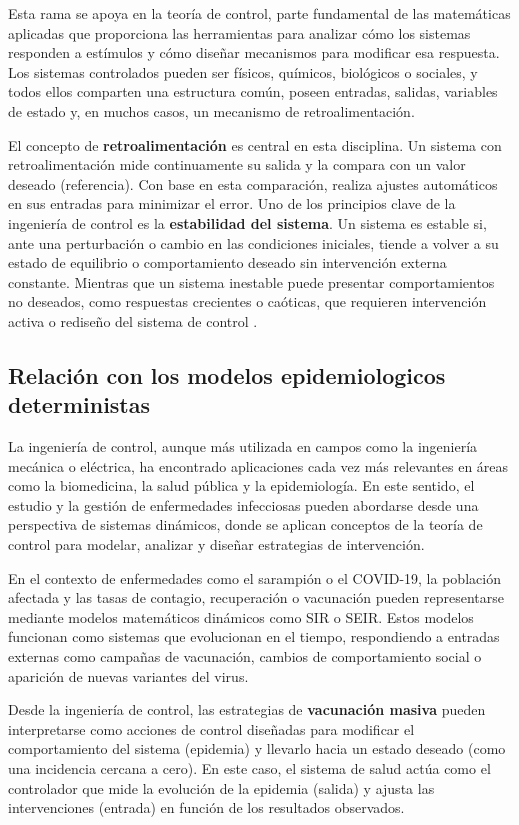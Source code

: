 Esta rama se apoya en la teoría de control, parte fundamental de las matemáticas aplicadas que proporciona las herramientas para analizar cómo los sistemas responden a estímulos y cómo diseñar mecanismos para modificar esa respuesta. Los sistemas controlados pueden ser físicos, químicos, biológicos o sociales, y todos ellos comparten una estructura común, poseen entradas, salidas, variables de estado y, en muchos casos, un mecanismo de retroalimentación.

El concepto de \textbf{retroalimentación} es central en esta disciplina. Un sistema con retroalimentación mide continuamente su salida y la compara con un valor deseado (referencia). Con base en esta comparación, realiza ajustes automáticos en sus entradas para minimizar el error. Uno de los principios clave de la ingeniería de control es la \textbf{estabilidad del sistema}. Un sistema es estable si, ante una perturbación o cambio en las condiciones iniciales, tiende a volver a su estado de equilibrio o comportamiento deseado sin intervención externa constante. Mientras que un sistema inestable puede presentar comportamientos no deseados, como respuestas crecientes o caóticas, que requieren intervención activa o rediseño del sistema de control \cite{ait_ingenieria_control}.

\subsection{Relación con los modelos epidemiologicos deterministas}
La ingeniería de control, aunque más utilizada en campos como la ingeniería mecánica o eléctrica, ha encontrado aplicaciones cada vez más relevantes en áreas como la biomedicina, la salud pública y la epidemiología. En este sentido, el estudio y la gestión de enfermedades infecciosas pueden abordarse desde una perspectiva de sistemas dinámicos, donde se aplican conceptos de la teoría de control para modelar, analizar y diseñar estrategias de intervención.

En el contexto de enfermedades como el sarampión o el COVID-19, la población afectada y las tasas de contagio, recuperación o vacunación pueden representarse mediante modelos matemáticos dinámicos como SIR o SEIR. Estos modelos funcionan como sistemas que evolucionan en el tiempo, respondiendo a entradas externas como campañas de vacunación, cambios de comportamiento social o aparición de nuevas variantes del virus.

Desde la ingeniería de control, las estrategias de \textbf{vacunación masiva} pueden interpretarse como acciones de control diseñadas para modificar el comportamiento del sistema (epidemia) y llevarlo hacia un estado deseado (como una incidencia cercana a cero). En este caso, el sistema de salud actúa como el controlador que mide la evolución de la epidemia (salida) y ajusta las intervenciones (entrada) en función de los resultados observados.

